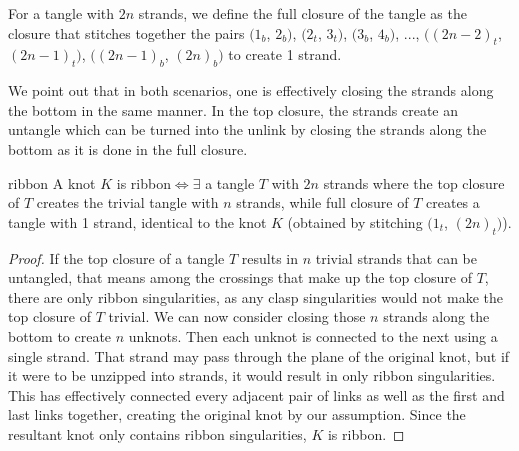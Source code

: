 \begin{paper}

For a tangle with $2n$ strands, we define the full closure of the tangle as the
closure that stitches together the pairs $(1_b$, $2_b)$, $(2_t$, $3_t)$, $(3_b$,
$4_b)$, $...$, $((2n-2)_t$, $(2n-1)_t)$, $((2n-1)_b$, $(2n)_b)$ to create 1
strand.


We point out that in both scenarios, one is effectively closing the strands
along the bottom in the same manner.
In the top closure, the strands create an untangle which can be turned into the
unlink by closing the strands along the bottom as it is done in the
full closure.

\begin{papertheorem}{ribbon}
A knot $K$ is ribbon$\iff\exists$ a tangle $T$ with $2n$ strands where the
top closure of $T$ creates the trivial tangle with $n$ strands, while
full closure of $T$ creates a tangle with 1 strand, identical to the knot $K$
(obtained by stitching $(1_t$, $(2n)_t)$).
\end{papertheorem}
\begin{proof}
If the top closure of a tangle $T$ results in $n$ trivial strands that can be
untangled, that means among the crossings that make up the top closure of $T$,
there are only ribbon singularities, as any clasp singularities would not make
the top closure of $T$ trivial.
We can now consider closing those $n$ strands along the bottom to create $n$
unknots.
Then each unknot is connected to the next using a single strand.
That strand may pass through the plane of the original knot, but if it were to
be unzipped into strands, it would result in only ribbon singularities.
This has effectively connected every adjacent pair of links as well as the first
and last links together, creating the original knot by our assumption.
Since the resultant knot only contains ribbon singularities, $K$ is ribbon.


\end{proof}
\end{paper}
